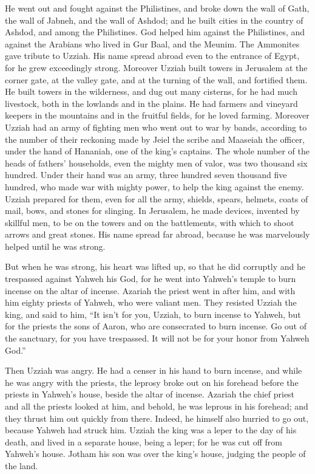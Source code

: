  He went out and fought against the Philistines, and broke
down the wall of Gath, the wall of Jabneh, and the wall of Ashdod; and
he built cities in the country of Ashdod, and among the Philistines.
 God helped him against the Philistines, and against the
Arabians who lived in Gur Baal, and the Meunim.  The
Ammonites gave tribute to Uzziah. His name spread abroad even to the
entrance of Egypt, for he grew exceedingly strong.  Moreover
Uzziah built towers in Jerusalem at the corner gate, at the valley gate,
and at the turning of the wall, and fortified them.  He
built towers in the wilderness, and dug out many cisterns, for he had
much livestock, both in the lowlands and in the plains. He had farmers
and vineyard keepers in the mountains and in the fruitful fields, for he
loved farming.  Moreover Uzziah had an army of fighting men
who went out to war by bands, according to the number of their reckoning
made by Jeiel the scribe and Maaseiah the officer, under the hand of
Hananiah, one of the king's captains.  The whole number of
the heads of fathers' households, even the mighty men of valor, was two
thousand six hundred.  Under their hand was an army, three
hundred seven thousand five hundred, who made war with mighty power, to
help the king against the enemy.  Uzziah prepared for them,
even for all the army, shields, spears, helmets, coats of mail, bows,
and stones for slinging.  In Jerusalem, he made devices,
invented by skillful men, to be on the towers and on the battlements,
with which to shoot arrows and great stones. His name spread far abroad,
because he was marvelously helped until he was strong.

 But when he was strong, his heart was lifted up, so that
he did corruptly and he trespassed against Yahweh his God, for he went
into Yahweh's temple to burn incense on the altar of incense.
 Azariah the priest went in after him, and with him eighty
priests of Yahweh, who were valiant men.  They resisted
Uzziah the king, and said to him, ``It isn't for you, Uzziah, to burn
incense to Yahweh, but for the priests the sons of Aaron, who are
consecrated to burn incense. Go out of the sanctuary, for you have
trespassed. It will not be for your honor from Yahweh God.''

 Then Uzziah was angry. He had a censer in his hand to burn
incense, and while he was angry with the priests, the leprosy broke out
on his forehead before the priests in Yahweh's house, beside the altar
of incense.  Azariah the chief priest and all the priests
looked at him, and behold, he was leprous in his forehead; and they
thrust him out quickly from there. Indeed, he himself also hurried to go
out, because Yahweh had struck him.  Uzziah the king was a
leper to the day of his death, and lived in a separate house, being a
leper; for he was cut off from Yahweh's house. Jotham his son was over
the king's house, judging the people of the land.

